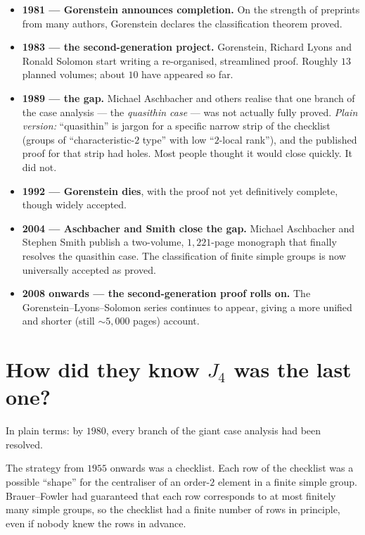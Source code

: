 \documentclass[11pt]{article}
\begin{document}
\begin{itemize}[leftmargin=*, itemsep=4pt]
        sporadics.
  \item \textbf{1981 --- Gorenstein announces completion.} On the
        strength of preprints from many authors, Gorenstein declares
        the classification theorem proved.
  \item \textbf{1983 --- the second-generation project.} Gorenstein,
        Richard Lyons and Ronald Solomon start writing a
        re-organised, streamlined proof. Roughly $13$ planned
        volumes; about $10$ have appeared so far.
  \item \textbf{1989 --- the gap.} Michael Aschbacher and others
        realise that one branch of the case analysis --- the
        \emph{quasithin case} --- was not actually fully proved.
        \emph{Plain version:} ``quasithin'' is jargon for a specific
        narrow strip of the checklist (groups of
        ``characteristic-$2$ type'' with low ``$2$-local rank''),
        and the published proof for that strip had holes. Most
        people thought it would close quickly. It did not.
  \item \textbf{1992 --- Gorenstein dies}, with the proof
        not yet definitively complete, though widely accepted.
  \item \textbf{2004 --- Aschbacher and Smith close the gap.}
        Michael Aschbacher and Stephen Smith publish a two-volume,
        $1{,}221$-page monograph that finally resolves the
        quasithin case. The classification of finite simple groups
        is now universally accepted as proved.
  \item \textbf{2008 onwards --- the second-generation proof rolls
        on.} The Gorenstein--Lyons--Solomon series continues to
        appear, giving a more unified and shorter (still $\sim
        5{,}000$ pages) account.
\end{itemize}

\section*{How did they know $J_4$ was the last one?}

In plain terms: by $1980$, every branch of the giant case analysis
had been resolved.

The strategy from $1955$ onwards was a checklist. Each row of the
checklist was a possible ``shape'' for the centraliser of an
order-$2$ element in a finite simple group. Brauer--Fowler had
guaranteed that each row corresponds to at most finitely many simple
groups, so the checklist had a finite number of rows in principle,
even if nobody knew the rows in advance.
\end{document}
